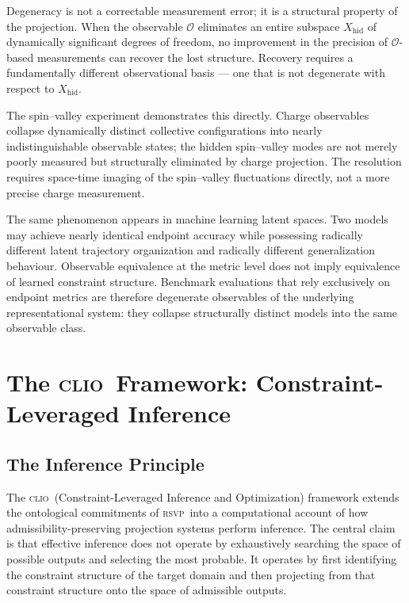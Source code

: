 \documentclass[11pt,a4paper]{article}
\theoremstyle{plain}
\theoremstyle{definition}
\theoremstyle{remark}
\newcommand{\RSVP}{\textup{\textsc{rsvp}}}
\newcommand{\CLIO}{\textup{\textsc{clio}}}
\begin{document}
Degeneracy is not a correctable measurement error; it is a structural
property of the projection. When the observable $\mathcal{O}$ eliminates
an entire subspace $X_{\mathrm{hid}}$ of dynamically significant degrees
of freedom, no improvement in the precision of $\mathcal{O}$-based
measurements can recover the lost structure. Recovery requires a
fundamentally different observational basis --- one that is not degenerate
with respect to $X_{\mathrm{hid}}$.

The spin--valley experiment demonstrates this directly. Charge observables
collapse dynamically distinct collective configurations into nearly
indistinguishable observable states; the hidden spin--valley modes are not
merely poorly measured but structurally eliminated by charge projection.
The resolution requires space-time imaging of the spin--valley fluctuations
directly, not a more precise charge measurement.

The same phenomenon appears in machine learning latent spaces. Two models
may achieve nearly identical endpoint accuracy while possessing radically
different latent trajectory organization and radically different
generalization behaviour. Observable equivalence at the metric level does
not imply equivalence of learned constraint structure. Benchmark
evaluations that rely exclusively on endpoint metrics are therefore
degenerate observables of the underlying representational system: they
collapse structurally distinct models into the same observable class.

\section{The \CLIO\ Framework: Constraint-Leveraged Inference}
\label{sec:clio}

\subsection{The Inference Principle}

The \CLIO\ (Constraint-Leveraged Inference and Optimization) framework
extends the ontological commitments of \RSVP\ into a computational account
of how admissibility-preserving projection systems perform inference.
The central claim is that effective inference does not operate by
exhaustively searching the space of possible outputs and selecting the
most probable. It operates by first identifying the constraint structure
of the target domain and then projecting from that constraint structure
onto the space of admissible outputs.
\end{document}
